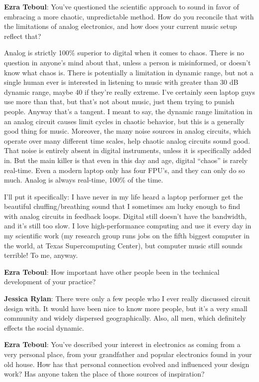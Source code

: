 \textbf{Ezra Teboul}: You've questioned the scientific approach to sound in favor of embracing a more chaotic, unpredictable method. How do you reconcile that with the limitations of analog electronics, and how does your current music setup reflect that? 

Analog is strictly 100\% superior to digital when it comes to chaos. There is no question in anyone's mind about that, unless a person is misinformed, or doesn't know what chaos is. There is potentially a limitation in dynamic range, but not a single human ever is interested in listening to music with greater than 30 dB dynamic range, maybe 40 if they're really extreme. I've certainly seen laptop guys use more than that, but that's not about music, just them trying to punish people. Anyway that's a tangent. I meant to say, the dynamic range limitation in an analog circuit causes limit cycles in chaotic behavior, but this is a generally good thing for music. Moreover, the many noise sources in analog circuits, which operate over many different time scales, help chaotic analog circuits sound good. That noise is entirely absent in digital instruments, unless it is specifically added in. But the main killer is that even in this day and age, digital ``chaos'' is rarely real-time. Even a modern laptop only has four FPU's, and they can only do so much. Analog is always real-time, 100\% of the time.

I'll put it specifically: I have never in my life heard a laptop performer get the beautiful chuffing/breathing sound that I sometimes am lucky enough to find with analog circuits in feedback loops. Digital still doesn't have the bandwidth, and it's still too slow. I love high-performance computing and use it every day in my scientific work (my research group runs jobs on the fifth biggest computer in the world, at Texas Supercomputing Center), but computer music still sounds terrible! To me, anyway.

\textbf{Ezra Teboul}: How important have other people been in the technical development of your practice? 

                  
\textbf{Jessica Rylan}: There were only a few people who I ever really discussed circuit design with. It would have been nice to know more people, but it's a very small community and widely dispersed geographically. Also, all men, which definitely effects the social dynamic.

\textbf{Ezra Teboul}: You've described your interest in electronics as coming from a very personal place, from your grandfather and popular electronics found in your old house. How has that personal connection evolved and influenced your design work? Has anyone taken the place of those sources of inspiration? 

